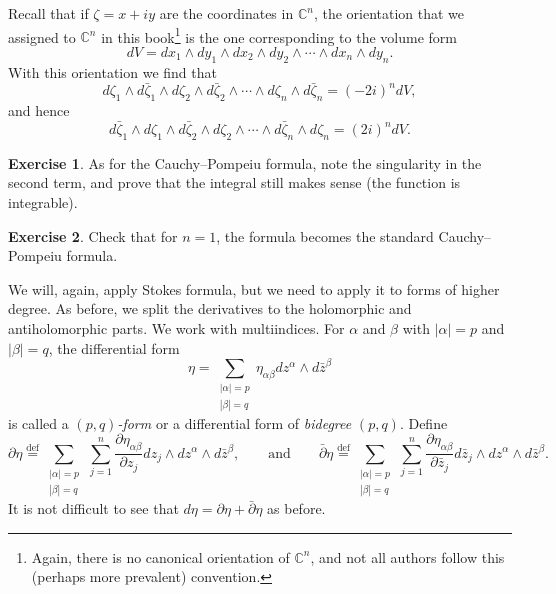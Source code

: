 \documentclass[12pt,openany]{book}
\newcommand{\abs}[1]{\left\lvert {#1} \right\rvert}
\newcommand{\C}{{\mathbb{C}}}
\newcommand{\myindex}[1]{#1\index{#1}}
\theoremstyle{plain}
\theoremstyle{remark}
\theoremstyle{definition}
\newenvironment{exbox}{%
    \def\FrameCommand{\vrule width 1pt \relax\hspace {10pt}}%
    \MakeFramed {\advance \hsize -\width \FrameRestore }%
}{%
    \endMakeFramed
}
\theoremstyle{exercise}
\newtheorem{exercise}{Exercise}[section]
\theoremstyle{example}
\begin{document}
Recall that if $\zeta = x+iy$ are the coordinates in $\C^n$, the orientation that we assigned to $\C^n$ in
this book\footnote{Again, there is
no canonical orientation of $\C^n$, and
not all authors follow this (perhaps more prevalent) convention.}
is the one corresponding to the volume form
\begin{equation*}
dV = dx_1 \wedge dy_1 \wedge dx_2 \wedge dy_2 \wedge \cdots \wedge dx_n \wedge dy_n .
\end{equation*}
With this orientation we find that
\begin{equation*}
d\zeta_1 \wedge d\bar{\zeta}_1 \wedge
d\zeta_2 \wedge d\bar{\zeta}_2 \wedge
\cdots \wedge
d\zeta_n \wedge d\bar{\zeta}_n = {(-2i)}^n dV ,
\end{equation*}
and hence
\begin{equation*}
d\bar{\zeta}_1 \wedge d\zeta_1 \wedge
d\bar{\zeta}_2 \wedge d\zeta_2 \wedge
\cdots \wedge
d\bar{\zeta}_n \wedge d\zeta_n = {(2i)}^n dV .
\end{equation*}

\begin{exbox}
\begin{exercise}
As for the Cauchy--Pompeiu formula,
note the singularity in the second term, and prove that the integral still makes
sense (the function is integrable).
\end{exercise}

\begin{exercise}
Check that for $n=1$, the formula becomes the standard Cauchy--Pompeiu
formula.
\end{exercise}
\end{exbox}

We will, again, apply Stokes formula, but we need to apply it to forms of higher
degree.  As before, we split the derivatives to the holomorphic and
antiholomorphic parts.  We work with multiindices.  For $\alpha$ and $\beta$
with $\abs{\alpha}=p$ and 
$\abs{\beta}=q$, the differential form
\begin{equation*}
\eta = 
\sum_{\substack{\abs{\alpha}=p \\ \abs{\beta}=q}}
\eta_{\alpha \beta} dz^\alpha \wedge d\bar{z}^\beta 
\end{equation*}
is called a \emph{\myindex{$(p,q)$-form}} or a differential form of
\emph{\myindex{bidegree}} $(p,q)$.
Define
\begin{equation*}
\partial \eta \overset{\text{def}}{=}
\sum_{\substack{\abs{\alpha}=p \\ \abs{\beta}=q}}
\,
\sum_{j=1}^n
\frac{\partial \eta_{\alpha \beta}}{\partial z_j} dz_j \wedge dz^\alpha
\wedge d\bar{z}^\beta ,
\qquad \text{and} \qquad
\bar{\partial} \eta \overset{\text{def}}{=}
\sum_{\substack{\abs{\alpha}=p \\ \abs{\beta}=q}}
\,
\sum_{j=1}^n
\frac{\partial \eta_{\alpha \beta}}{\partial \bar{z}_j} d\bar{z}_j \wedge dz^\alpha
\wedge d\bar{z}^\beta .
\end{equation*}
It is not difficult to see that $d \eta = \partial \eta +
\bar{\partial} \eta$ as before.
\end{document}
